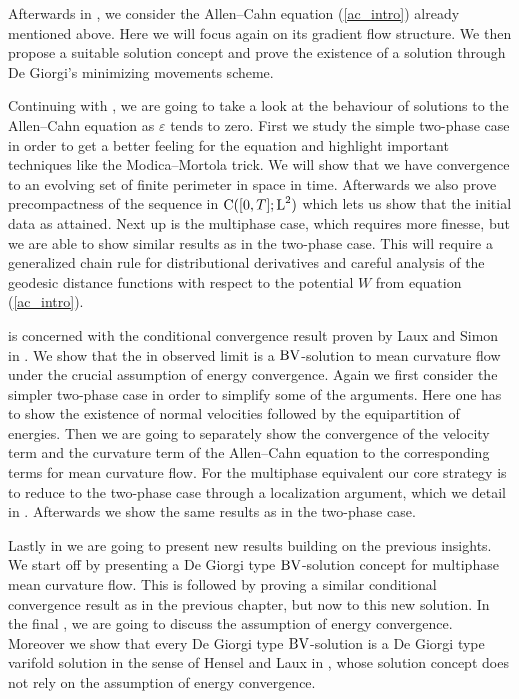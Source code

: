 Afterwards in , we consider the Allen--Cahn equation 
(\ref{ac_intro}) already mentioned above. Here we will focus again on its 
gradient flow structure. We then propose a suitable solution concept and prove 
the existence of a solution through De Giorgi's minimizing movements scheme.

Continuing with , we are going 
to take a look at the behaviour of solutions to the Allen--Cahn equation as $ 
\varepsilon $ tends to zero. First we study the simple two-phase case in order 
to get a better feeling for the equation and highlight important techniques 
like the Modica--Mortola trick. We will show that we have convergence to an 
evolving set of finite perimeter in space in time. Afterwards we also prove 
precompactness of the sequence in $ \operatorname{C} ( [ 0 , T ] ; \operatorname{L}^{ 2 } ) $ which 
lets us show that the initial data as attained. Next up is the multiphase case, 
which requires more finesse, but we are able to show similar results as in the 
two-phase case. This will require a generalized chain rule for distributional 
derivatives and careful analysis of the geodesic distance functions with 
respect to the potential $ W $ from equation (\ref{ac_intro}).

 is concerned with the conditional 
convergence result proven by Laux and Simon in 
\cite{convergence_of_allen_cahn_equation_to_multiphase_mean_curvature_flow}. We 
show that the in  observed 
limit is a $ \operatorname{BV} $-solution to mean curvature flow under the crucial assumption 
of energy convergence. Again we first consider the simpler two-phase case in 
order to simplify some of the arguments. Here one has to show the existence of 
normal velocities followed by the equipartition of energies. Then we are going 
to separately show the convergence of the velocity term and the curvature term 
of the Allen--Cahn equation to the corresponding terms for mean curvature flow. 
For the multiphase equivalent our core strategy is to reduce to the two-phase 
case through a localization argument, which we detail in 
. Afterwards we show the same results as 
in the two-phase case.

Lastly in  we are going to present new results 
building on the previous insights. We start off by presenting a De Giorgi type 
$ \operatorname{BV} $-solution concept for multiphase mean curvature flow. This is followed 
by proving a similar conditional convergence result as in the previous chapter, 
but now to this new solution. In the final 
, we are going to 
discuss the assumption of energy convergence. Moreover we show that every De 
Giorgi type $ \operatorname{BV} $-solution is a De Giorgi type varifold solution in the sense 
of Hensel and Laux in 
\cite{hensel_laux_varifold_solution_concept_for_mean_curvature_flow}, whose 
solution concept does not rely on the assumption of energy convergence.




